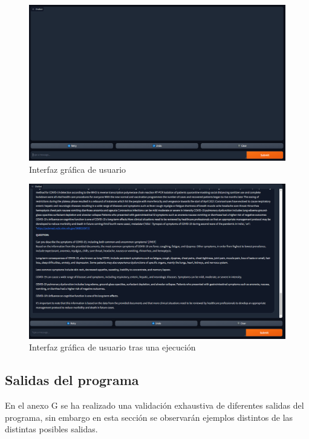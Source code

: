 \begin{figure}[h!]
    \centering
    \includegraphics[width=1\textwidth]{img/guivacia.png}
    \caption{Interfaz gráfica de usuario}
    \label{fig:guivacia}
\end{figure}

\begin{figure}[h!]
    \centering
    \includegraphics[width=1\textwidth]{img/guirellena.png}
    \caption{Interfaz gráfica de usuario tras una ejecución}
    \label{fig:guirellena}
\end{figure}

\FloatBarrier

\subsection{Salidas del programa}

En el anexo G se ha realizado una validación exhaustiva de diferentes salidas del programa, sin embargo en esta sección se observarán ejemplos distintos de las distintas posibles salidas.


